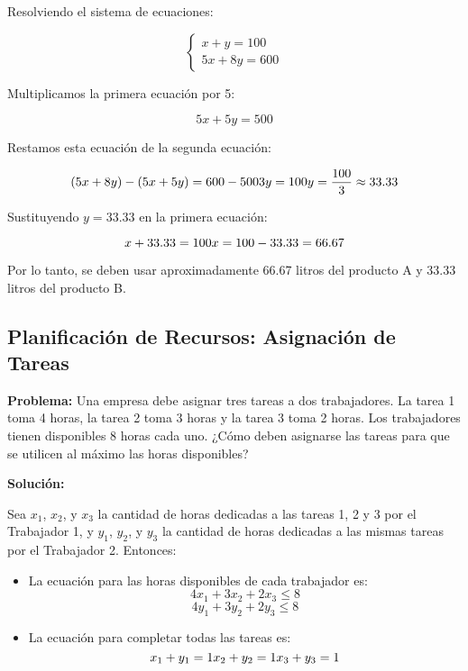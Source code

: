     Resolviendo el sistema de ecuaciones:
    
    \[
    \begin{cases}
    x + y = 100 \\
    5x + 8y = 600
    \end{cases}
    \]
    
    Multiplicamos la primera ecuación por 5:
    
    \[
    5x + 5y = 500
    \]
    
    Restamos esta ecuación de la segunda ecuación:
    
    \[
    (5x + 8y) - (5x + 5y) = 600 - 500 \\
    3y = 100 \\
    y = \frac{100}{3} \approx 33.33
    \]
    
    Sustituyendo \( y = 33.33 \) en la primera ecuación:
    
    \[
    x + 33.33 = 100 \\
    x = 100 - 33.33 = 66.67
    \]
    
    Por lo tanto, se deben usar aproximadamente 66.67 litros del producto A y 33.33 litros del producto B.
    
    \subsection{Planificación de Recursos: Asignación de Tareas}
    
    \textbf{Problema:} Una empresa debe asignar tres tareas a dos trabajadores. La tarea 1 toma 4 horas, la tarea 2 toma 3 horas y la tarea 3 toma 2 horas. Los trabajadores tienen disponibles 8 horas cada uno. ¿Cómo deben asignarse las tareas para que se utilicen al máximo las horas disponibles?
    
    \textbf{Solución:}
    
    Sea \( x_1 \), \( x_2 \), y \( x_3 \) la cantidad de horas dedicadas a las tareas 1, 2 y 3 por el Trabajador 1, y \( y_1 \), \( y_2 \), y \( y_3 \) la cantidad de horas dedicadas a las mismas tareas por el Trabajador 2. Entonces:
    
    \begin{itemize}
        \item La ecuación para las horas disponibles de cada trabajador es:
        \[
        4x_1 + 3x_2 + 2x_3 \leq 8
        \]
        \[
        4y_1 + 3y_2 + 2y_3 \leq 8
        \]
        \item La ecuación para completar todas las tareas es:
        \[
        x_1 + y_1 = 1 \\
        x_2 + y_2 = 1 \\
        x_3 + y_3 = 1
        \]
    \end{itemize}
    
